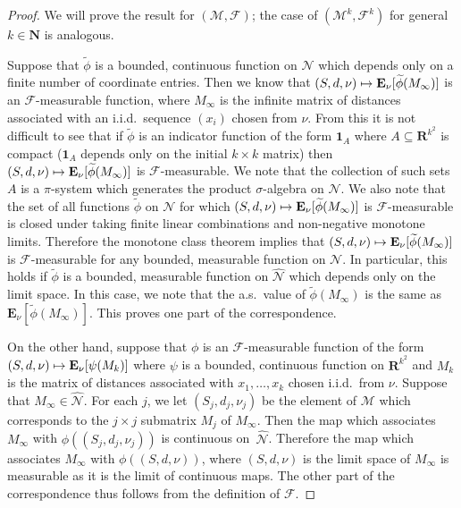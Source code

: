\documentclass[10pt]{amsart}
\let\mathcal\mathscr
\newcommand\mto{\mathchoice{\longmapsto}{\mapsto}{\mapsto}{\mapsto}}
\theoremstyle{plain}
\numberwithin{theorem}{section}
\theoremstyle{definition}
\newcommand{\CF}{{\mathcal F}}
\newcommand\mmspace{{\mathcal M}}
\newcommand\mmsigma{{\mathcal F}}
\newcommand{\matrixmspace}{\mathcal N}
\newcommand \E {{\mathbf E}}
\newcommand{\R}{\mathbf{R}}
\newcommand{\N}{\mathbf{N}}
\newcommand{\one}{{\mathbf 1}}
\let\wh\widehat
\let\wt\widetilde
\begin{document}
\begin{proof}
We will prove the result for $(\mmspace,\mmsigma)$; the case of $(\mmspace^k,\mmsigma^k)$ for general $k \in \N$ is analogous.

Suppose that $\wt{\phi}$ is a bounded, continuous function on $\matrixmspace$ which depends only on a finite number of coordinate entries. Then we know that $(S,d,\nu) \mto \E_\nu[ \wt{\phi}(M_\infty)]$ is an $\mmsigma$-measurable function, where $M_\infty$ is the infinite matrix of distances associated with an i.i.d.\ sequence $(x_i)$ chosen from $\nu$. From this it is not difficult to see that if $\wt{\phi}$ is an indicator function of the form $\one_A$ where $A \subseteq \R^{k^2}$ is compact (\ie $\one_A$ depends only on the initial $k \times k$ matrix) then $(S,d,\nu) \mto \E_\nu[ \wt{\phi}(M_\infty)]$ is $\mmsigma$-measurable. We note that the collection of such sets $A$ is a $\pi$-system which generates the product $\sigma$-algebra on $\matrixmspace$. We also note that the set of all functions $\wt{\phi}$ on $\matrixmspace$ for which $(S,d,\nu) \mto \E_\nu[ \wt{\phi}(M_\infty)]$ is $\mmsigma$\nobreakdash-measurable is closed under taking finite linear combinations and non-negative monotone limits. Therefore the monotone class theorem implies that $(S,d,\nu) \mto \E_\nu[\wt{\phi}(M_\infty)]$ is $\mmsigma$-measurable for any bounded, measurable function on $\matrixmspace$. In particular, this holds if $\wt{\phi}$ is a bounded, measurable function on $\wh{\matrixmspace}$ which depends only on the limit space. In this case, we note that the a.s.\ value of $\wt{\phi}(M_\infty)$ is the same as $\E_\nu[\wt{\phi}(M_\infty)]$. This proves one part of the correspondence.

On the other hand, suppose that $\phi$ is an $\mmsigma$-measurable function of the form $(S,d,\nu) \mto \E_\nu[\psi(M_k)]$ where $\psi$ is a bounded, continuous function on $\R^{k^2}$ and $M_k$ is the matrix of distances associated with $x_1,\ldots,x_k$ chosen i.i.d.\ from $\nu$. Suppose that $M_\infty \in \wh{\matrixmspace}$. For each $j$, we let $(S_j,d_j,\nu_j)$ be the element of $\mmspace$ which corresponds to the $j \times j$ submatrix $M_j$ of $M_\infty$. Then the map which associates $M_\infty$ with $\phi((S_j,d_j,\nu_j))$ is continuous on~$\wh{\matrixmspace}$. Therefore the map which associates $M_\infty$ with $\phi((S,d,\nu))$, where $(S,d,\nu)$ is the limit space of $M_\infty$ is measurable as it is the limit of continuous maps. The other part of the correspondence thus follows from the definition of $\CF$.
\end{proof}
\end{document}
